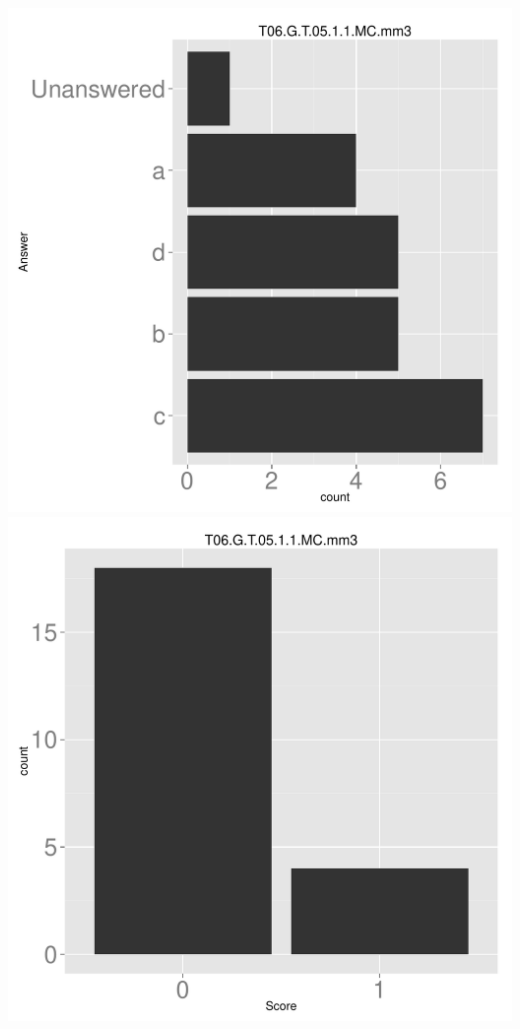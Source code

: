 \documentclass[12pt,nohyper]{tufte-handout}\usepackage[]{graphicx}\usepackage[]{color}
\begin{document}
\begin{center} \includegraphics[width=.45\linewidth]{Topic06_80_answer} \includegraphics[width=.45\linewidth]{Topic06_80_score} \end{center} 
\end{document}

